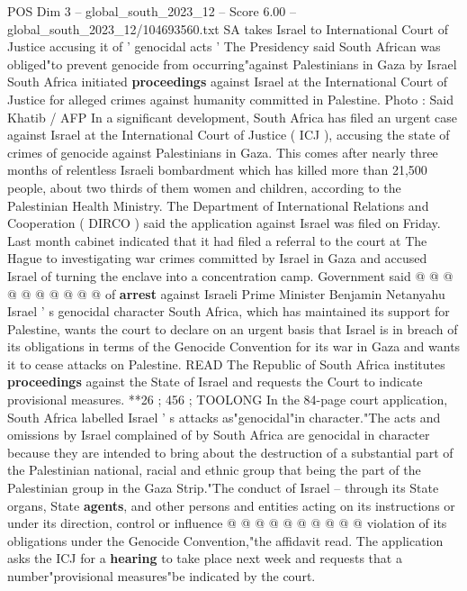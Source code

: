 \begin{textsample}{POS Dim 3 – global\_south\_2023\_12 – Score 6.00 – global\_south\_2023\_12/104693560.txt}  \label{ex:f3_pos_444}
SA takes Israel to International Court of Justice accusing it of ' genocidal acts ' The Presidency said South African was obliged"to prevent genocide from occurring"against Palestinians in Gaza by Israel South Africa initiated \textbf{proceedings} against Israel at the International Court of Justice for alleged crimes against humanity committed in Palestine.
Photo : Said Khatib / AFP In a significant development, South Africa has filed an urgent case against Israel at the International Court of Justice ( ICJ ), accusing the state of crimes of genocide against Palestinians in Gaza.
This comes after nearly three months of relentless Israeli bombardment which has killed more than 21,500 people, about two thirds of them women and children, according to the Palestinian Health Ministry.
The Department of International Relations and Cooperation ( DIRCO ) said the application against Israel was filed on Friday.
Last month cabinet indicated that it had filed a referral to the court at The Hague to investigating war crimes committed by Israel in Gaza and accused Israel of turning the enclave into a concentration camp.
Government said @ @ @ @ @ @ @ @ @ @ of \textbf{arrest} against Israeli Prime Minister Benjamin Netanyahu Israel ' s genocidal character South Africa, which has maintained its support for Palestine, wants the court to declare on an urgent basis that Israel is in breach of its obligations in terms of the Genocide Convention for its war in Gaza and wants it to cease attacks on Palestine.
READ The Republic of South Africa institutes \textbf{proceedings} against the State of Israel and requests the Court to indicate provisional measures. **26 ; 456 ; TOOLONG In the 84-page court application, South Africa labelled Israel ' s attacks as"genocidal"in character."The acts and omissions by Israel complained of by South Africa are genocidal in character because they are intended to bring about the destruction of a substantial part of the Palestinian national, racial and ethnic group that being the part of the Palestinian group in the Gaza Strip."The conduct of Israel -- through its State organs, State \textbf{agents}, and other persons and entities acting on its instructions or under its direction, control or influence @ @ @ @ @ @ @ @ @ @ violation of its obligations under the Genocide Convention,"the affidavit read.
The application asks the ICJ for a \textbf{hearing} to take place next week and requests that a number"provisional measures"be indicated by the court.

\end{textsample}
